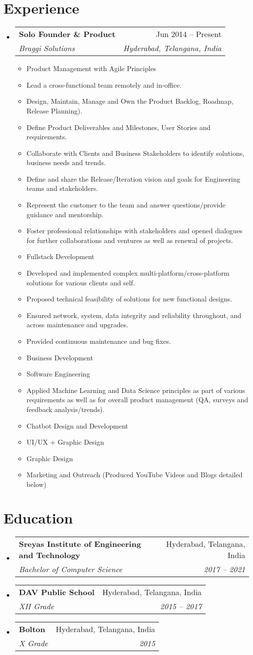 \documentclass[a4paper,11pt]{article}
\makeatletter
\newcommand{\resumeItem}[1]{
  \item\large{#1}
}
\newcommand{\resumeItemListStart}{\begin{itemize}[rightmargin=0.11in]}
\newcommand{\resumeItemListEnd}{\end{itemize}}
\newcommand{\resumeQuadHeading}[4]{
  \item
  \begin{tabular*}{0.96\textwidth}[t]{l@{\extracolsep{\fill}}r}
    \textbf{#1} & #2 \\
    \textit{\large#3} & \textit{\large #4} \\
  \end{tabular*}
}
\newcommand{\resumeHeadingListStart}{
  \begin{itemize}[leftmargin=0.15in, label={}]
}
\newcommand{\resumeHeadingListEnd}{\end{itemize}}
\makeatother
\begin{document}
\section{\LARGE{Experience}}
\resumeHeadingListStart{}
  \resumeQuadHeading{Solo Founder \& Product}{Jun 2014 -- Present}
  {Braggi Solutions}{Hyderabad, Telangana, India}
    \resumeItemListStart{}
	\resumeItem{Product Management with Agile Principles}
	\resumeItem{Lead a cross-functional team remotely and in-office.}
	\resumeItem{Design, Maintain, Manage and Own the Product Backlog, Roadmap, Release Planning).}
	\resumeItem{Define Product Deliverables and Milestones, User Stories and requirements.}
	\resumeItem{Collaborate with Clients and Business Stakeholders to identify solutions, business needs and trends.}
	\resumeItem{Define and share the Release/Iteration vision and goals for Engineering teams and stakeholders.}
	\resumeItem{Represent the customer to the team and answer questions/provide guidance and mentorship.}
	\resumeItem{Foster professional relationships with stakeholders and opened dialogues for further collaborations and ventures as well as renewal of projects.}
	\resumeItem{Fullstack Development}
	\resumeItem{Developed and implemented complex multi-platform/cross-platform solutions for various clients and self.}
	\resumeItem{Proposed technical feasibility of solutions for new functional designs.}
	\resumeItem{Ensured network, system, data integrity and reliability throughout, and across maintenance and upgrades.}
	\resumeItem{Provided continuous maintenance and bug fixes.}
	\resumeItem{Business Development}
	\resumeItem{Software Engineering}
	\resumeItem{Applied Machine Learning and Data Science principles as part of various requirements as well as for overall product management (QA, surveys and feedback analysis/trends).}
	\resumeItem{Chatbot Design and Development}
	\resumeItem{UI/UX + Graphic Design}
	\resumeItem{Graphic Design}
	\resumeItem{Marketing and Outreach (Produced YouTube Videos and Blogs detailed below)}
    \resumeItemListEnd{}
\resumeHeadingListEnd{}



\section{\LARGE{Education}}
  \resumeHeadingListStart{}
    \resumeQuadHeading{Sreyas Institute of Engineering and Technology}{Hyderabad, Telangana, India}
    {Bachelor of Computer Science}{2017 -- 2021}
  \resumeHeadingListEnd{}
  \resumeHeadingListStart{}
    \resumeQuadHeading{DAV Public School}{Hyderabad, Telangana, India}
    {XII Grade}{2015 -- 2017}
  \resumeHeadingListEnd{}
  \resumeHeadingListStart{}
    \resumeQuadHeading{Bolton}{Hyderabad, Telangana, India}
    {X Grade}{2015}
  \resumeHeadingListEnd{}
\end{document}

